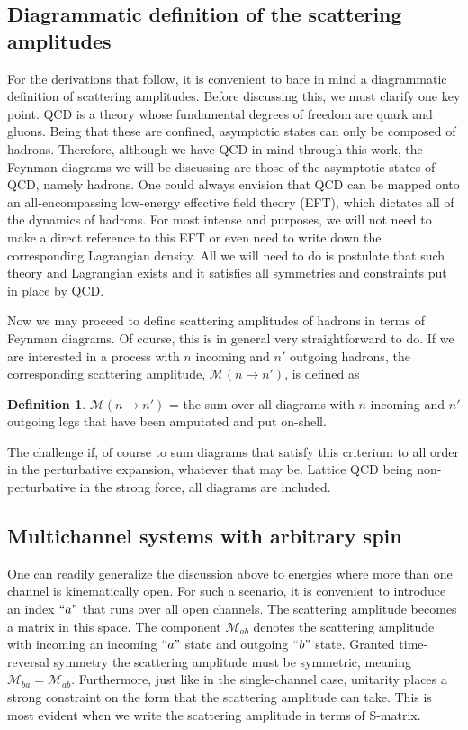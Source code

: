 \documentclass{iopart}
\theoremstyle{definition}
\newtheorem{definition}{Definition}
\begin{document}
{\subsection{Diagrammatic definition of the scattering amplitudes}
For the derivations that follow, it is convenient to bare in mind a diagrammatic definition of scattering amplitudes. Before discussing this, we must clarify one key point. QCD is a theory whose fundamental degrees of freedom are quark and gluons. Being that these are confined, asymptotic states can only be composed of hadrons. Therefore, although we have QCD in mind through this work, the Feynman diagrams we will be discussing are those of the asymptotic states of QCD, namely hadrons. One could always envision that QCD can be mapped onto an all-encompassing low-energy effective field theory (EFT), which dictates all of the dynamics of hadrons. For most intense and purposes, we will not need to make a direct reference to this EFT or even need to write down the corresponding Lagrangian density. All we will need to do is postulate that such theory and Lagrangian exists and it satisfies all symmetries and constraints put in place by QCD.

Now we may proceed to define scattering amplitudes of hadrons in terms of Feynman diagrams. Of course, this is in general very straightforward to do. If we are interested in a process with $n$ incoming and $n'$ outgoing hadrons, the corresponding scattering amplitude, $\mathcal{M}(n\to n')$, is defined as
\theoremstyle{definition}
\begin{definition}
{$\mathcal{M}(n\to n')$} = the sum over all diagrams with $n$ incoming and $n'$ outgoing legs that have been amputated and put on-shell.
\end{definition} 
\noindent
The challenge if, of course to sum diagrams that satisfy this criterium to all order in the perturbative expansion, whatever that may be. Lattice QCD being non-perturbative in the strong force, all diagrams are included. 


\subsection{Multichannel systems with arbitrary spin}
One can readily generalize the discussion above to energies where more than one channel is kinematically open. For such a scenario, it is convenient to introduce an index $``a"$ that runs over all open channels. The scattering amplitude becomes a matrix in this space. The component $\mathcal M_{ab}$ denotes the scattering amplitude with incoming an incoming $``a"$ state and outgoing $``b"$ state. Granted time-reversal symmetry the scattering amplitude must be symmetric, meaning $\mathcal M_{ba}=\mathcal M_{ab}$. Furthermore, just like in the single-channel case, unitarity places a strong constraint on the form that the scattering amplitude can take. This is most evident when we write the scattering amplitude in terms of S-matrix. 

}
\end{document}
